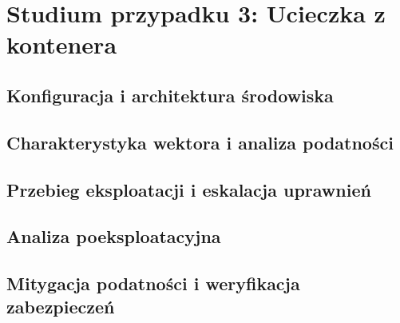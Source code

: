 \chapter{Studium przypadku 3: Ucieczka z kontenera}\label{ch:cs3-breakout}

\section{Konfiguracja i architektura środowiska}\label{sec:cs3-srodowisko}

\section{Charakterystyka wektora i analiza podatności}\label{sec:cs3-teoria-podatnosc}

\section{Przebieg eksploatacji i eskalacja uprawnień}\label{sec:cs3-eksploatacja}

\section{Analiza poeksploatacyjna}\label{sec:cs3-analiza-poeksploatacyjna}

\section{Mitygacja podatności i weryfikacja zabezpieczeń}\label{sec:cs3-mitygacja}

